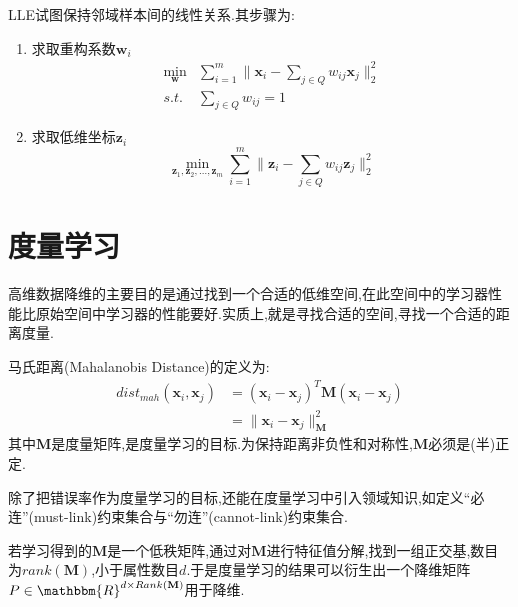 LLE试图保持邻域样本间的线性关系.其步骤为:
\begin{enumerate}
\item 求取重构系数$\mathbf{w}_i$
\begin{equation}\begin{split}
\min_{\mathbf{w}}&\sum_{i=1}^m\|\mathbf{x}_i-\sum_{j\in Q}w_{ij}\mathbf{x}_j\|^2_2\\
s.t.& \sum_{j\in Q}w_{ij}=1
\end{split}\end{equation}
\item 求取低维坐标$\mathbf{z}_i$
\begin{equation}
\min_{\mathbf{z}_1, \mathbf{z}_2, \dots, \mathbf{z}_m}\sum_{i=1}^m\|\mathbf{z}_i-\sum_{j\in Q}w_{ij}\mathbf{z}_j\|_2^2
\end{equation}
\end{enumerate}

\section{度量学习}

高维数据降维的主要目的是通过找到一个合适的低维空间,在此空间中的学习器性能比原始空间中学习器的性能要好.实质上,就是寻找合适的空间,寻找一个合适的距离度量.

马氏距离(Mahalanobis Distance)的定义为:
\begin{equation}\begin{split}
dist_{mah}(\mathbf{x}_i, \mathbf{x}_j)&=(\mathbf{x}_i -\mathbf{x}_j)^T\mathbf{M}(\mathbf{x}_i -\mathbf{x}_j)\\&=\|\mathbf{x}_i -\mathbf{x}_j\|_{\mathbf{M}}^2
\end{split}\end{equation}
其中$\mathbf{M}$是度量矩阵,是度量学习的目标.为保持距离非负性和对称性,$\mathbf{M}$必须是(半)正定.

除了把错误率作为度量学习的目标,还能在度量学习中引入领域知识,如定义``必连''(must-link)约束集合与``勿连''(cannot-link)约束集合.

若学习得到的$\mathbf{M}$是一个低秩矩阵,通过对$\mathbf{M}$进行特征值分解,找到一组正交基,数目为$rank(\mathbf{M})$,小于属性数目$d$.于是度量学习的结果可以衍生出一个降维矩阵$P\in\mathbbm{R}^{d\times Rank(\mathbf{M})}$用于降维.